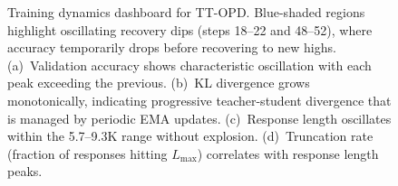 \begin{figure}[t]
\begin{subfigure}[b]{0.24\textwidth}
\end{subfigure}
\caption{Training dynamics dashboard for TT-OPD. Blue-shaded regions highlight oscillating recovery dips (steps 18--22 and 48--52), where accuracy temporarily drops before recovering to new highs. (a)~Validation accuracy shows characteristic oscillation with each peak exceeding the previous. (b)~KL divergence grows monotonically, indicating progressive teacher-student divergence that is managed by periodic EMA updates. (c)~Response length oscillates within the 5.7--9.3K range without explosion. (d)~Truncation rate (fraction of responses hitting $L_{\max}$) correlates with response length peaks.}
\label{fig:training_dashboard}
\end{figure}



